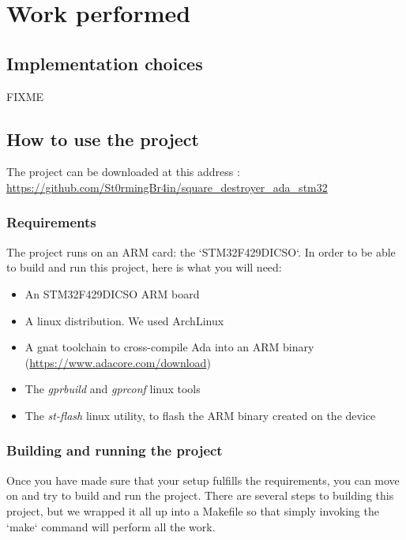 \section{Work performed}

\subsection{Implementation choices}

FIXME

\subsection{How to use the project}

\begin{noindent}
The project can be downloaded at this address : \\
\url{https://github.com/St0rmingBr4in/square_destroyer_ada_stm32}
\end{noindent}

\subsubsection{Requirements}

The project runs on an ARM card: the `STM32F429DICSO`. In order to be able to
build and run this project, here is what you will need:

\begin{itemize}
	\item An STM32F429DICSO ARM board
	\item A linux distribution. We used ArchLinux
    \item A gnat toolchain to cross-compile Ada into an ARM binary
		(\url{https://www.adacore.com/download})
	\item The \textit{gprbuild} and \textit{gprconf} linux tools
	\item The \textit{st-flash} linux utility, to flash the ARM binary created on the
		  device
\end{itemize}

\subsubsection{Building and running the project}

Once you have made sure that your setup fulfills the requirements, you can
move on and try to build and run the project. There are several steps to
building this project, but we wrapped it all up into a Makefile so that simply
invoking the `make` command will perform all the work.

